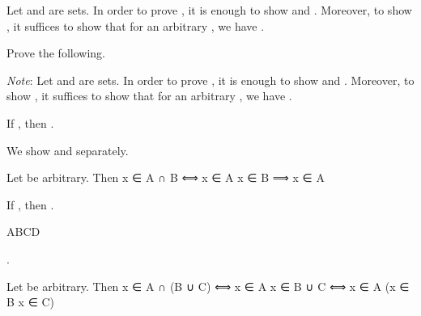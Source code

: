 \stopexercises

\startexercises [title={\getvariable{document}{author}  \hfill  \getvariable{document}{course}: Prelim  \hfill  2019-10-08}]

	\startremark
		Let  and  are sets. In order to prove , it is enough to show  and . Moreover, to show , it suffices to show that for an arbitrary , we have .  %
	\stopremark

	\startexercise [title={Set Theory (10 × 3)}]
		Prove the following.

		\emph{Note}: Let  and  are sets. In order to prove , it is enough to show  and . Moreover, to show , it suffices to show that for an arbitrary , we have .  %

		\startitemize [i]
			\item  If , then .

				\startsolution
					We show  and  separately.

					  \qquad
					Let  be arbitrary. Then
					\startformula
						x ∈ A ∩ B  \qquad ⟺ \qquad  x ∈ A  x ∈ B  \qquad ⟹ \qquad  x ∈ A
					\stopformula

					\bold{(⊇)}  \qquad

				\stopsolution

			\item  If , then .

				\startsolution
					ABCD
				\stopsolution
				
			\item  {}.

				\startsolution
					Let  be arbitrary. Then
					\startformula  \startalign
						\NC  x ∈ A ∩ (B ∪ C)  \NC  ⟺  x ∈ A  x ∈ B ∪ C  \NR
						\NC  \NC  ⟺  x ∈ A  (x ∈ B  x ∈ C)  \NR
					\stopalign  \stopformula
				\stopsolution
				
		\stopitemize
	\stopexercise

	\startexercise [title={Construction (10 × 2)}]
		\startitemize [i]

